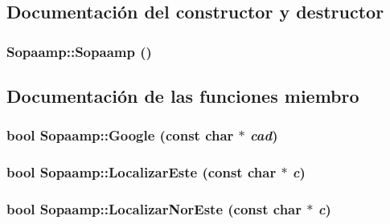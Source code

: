 \subsection{Documentación del constructor y destructor}
\hypertarget{class_sopaamp_47547dc7d6258ce99609e93705b32526}{
\subsubsection[{Sopaamp}]{\setlength{\rightskip}{0pt plus 5cm}Sopaamp::Sopaamp ()}}
\label{class_sopaamp_47547dc7d6258ce99609e93705b32526}




\subsection{Documentación de las funciones miembro}
\hypertarget{class_sopaamp_329046ee52336b772249e080ca6b9eb2}{
\subsubsection[{Google}]{\setlength{\rightskip}{0pt plus 5cm}bool Sopaamp::Google (const char $\ast$ {\em cad})}}
\label{class_sopaamp_329046ee52336b772249e080ca6b9eb2}


\hypertarget{class_sopaamp_b0fa03b65273f552bcd391325361e613}{
\subsubsection[{LocalizarEste}]{\setlength{\rightskip}{0pt plus 5cm}bool Sopaamp::LocalizarEste (const char $\ast$ {\em c})}}
\label{class_sopaamp_b0fa03b65273f552bcd391325361e613}


\hypertarget{class_sopaamp_d76fce7a733f946db1692a156312dedb}{
\subsubsection[{LocalizarNorEste}]{\setlength{\rightskip}{0pt plus 5cm}bool Sopaamp::LocalizarNorEste (const char $\ast$ {\em c})}}
\label{class_sopaamp_d76fce7a733f946db1692a156312dedb}


